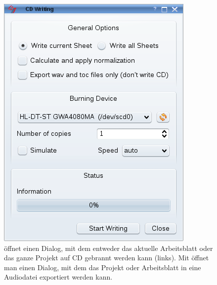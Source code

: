 \begin{figure}[t]
 \centering\includegraphics[width=\textwidth]{../images/exportdlg}
 \caption{ öffnet einen Dialog, mit dem entweder das aktuelle Arbeitsblatt oder das ganze Projekt auf CD gebrannt werden kann (links). Mit  öffnet man einen Dialog, mit dem das Projekt oder Arbeitsblatt in eine Audiodatei exportiert werden kann.}
 \label{fig_exportdlg}
\end{figure}


